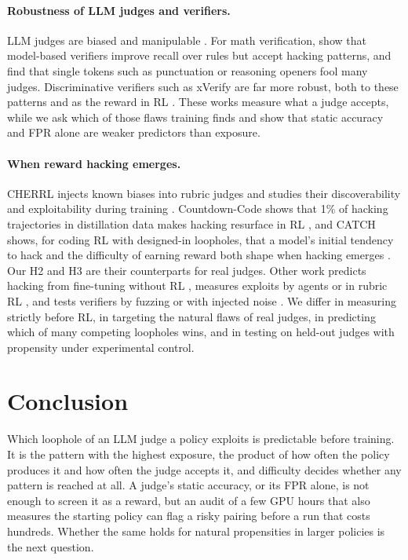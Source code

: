 \documentclass[11pt]{article}
\begin{document}
\paragraph{Robustness of LLM judges and verifiers.} LLM judges are biased and manipulable
\citep{zheng2023judging}. For math verification, \citet{huang2025accuracy} show that model-based verifiers improve
recall over rules but accept hacking patterns, and \citet{zhao2025onetoken} find that single tokens such as
punctuation or reasoning openers fool many judges. Discriminative verifiers such as xVerify \citep{chen2025xverify}
are far more robust, both to these patterns and as the reward in RL \citep{huang2025accuracy}. These works measure
what a judge accepts, while we ask which of those flaws training finds and show that static accuracy and FPR alone
are weaker predictors than exposure.

\paragraph{When reward hacking emerges.} CHERRL injects known biases into rubric judges and studies their
discoverability and exploitability during training \citep{wang2026rubric}. Countdown-Code shows that 1\% of hacking
trajectories in distillation data makes hacking resurface in RL \citep{khalifa2026countdown}, and CATCH shows, for
coding RL with designed-in loopholes, that a model's initial tendency to hack and the difficulty of earning reward
both shape when hacking emerges \citep{wang2026catch}. Our H2 and H3 are their counterparts for real judges. Other
work predicts hacking from fine-tuning without RL \citep{eleutherai2026indicators}, measures exploits by agents
\citep{thaman2026benchmark} or in rubric RL \citep{mahmoud2026rubric}, and tests verifiers by fuzzing
\citep{ray2026fuzzing} or with injected noise \citep{plesner2026imperfect}. We differ in measuring strictly before
RL, in targeting the natural flaws of real judges, in predicting which of many competing loopholes wins, and in
testing on held-out judges with propensity under experimental control.

\section{Conclusion}

Which loophole of an LLM judge a policy exploits is predictable before training. It is the pattern with the highest
exposure, the product of how often the policy produces it and how often the judge accepts it, and difficulty
decides whether any pattern is reached at all. A judge's static accuracy, or its FPR alone, is not enough to screen
it as a reward, but an audit of a few GPU hours that also measures the starting policy can flag a risky pairing before a
run that costs hundreds. Whether the same holds for natural propensities in larger policies is the next question.
\end{document}
